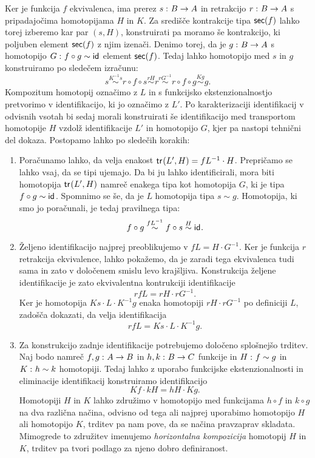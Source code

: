 \begin{dokaz}
  Ker je funkcija \(f\) ekvivalenca, ima prerez \(s \,\colon B \to A\) in retrakcijo \(r \,\colon B \to A\) s pripadajočima homotopijama \(H\) in \(K\). Za središče kontrakcije tipa \(\textnormal{\textsf{sec}}(f)\) lahko torej izberemo kar par \((s, H)\), konstruirati pa moramo še kontrakcijo, ki poljuben element \(\textnormal{\textsf{sec}}(f)\) z njim izenači.
  Denimo torej, da je \(g \,\colon B \to A\) s homotopijo \(G \,\colon f \circ g \sim \textnormal{\textsf{id}}_{}\) element \(\textnormal{\textsf{sec}}(f)\). Tedaj lahko homotopijo med \(s\) in \(g\) konstruiramo po sledečem izračunu:
  \[s \overset{K^{-1}s}{\sim} r \circ f \circ s \overset{rH}{\sim}
    r \overset{rG^{-1}}{\sim} r \circ f \circ g \overset{Kg}{\sim} g.\]
  Kompozitum homotopij označimo z \(L\) in s funkcijsko ekstenzionalnostjo pretvorimo v identifikacijo, ki jo označimo z \(L'\). Po karakterizaciji identifikacij v odvisnih vsotah bi sedaj morali konstruirati še identifikacijo med transportom homotopije \(H\) vzdolž identifikacije \(L'\) in homotopijo \(G\), kjer pa nastopi tehnični del dokaza. Postopamo lahko po sledečih korakih:
  \begin{enumerate}
  \item Poračunamo lahko, da velja enakost \(\textnormal{\textsf{tr}}_{}(L', H) = fL^{-1} \cdot H\). Prepričamo se lahko vsaj, da se tipi ujemajo. Da bi ju lahko identificirali, mora biti homotopija \(\textnormal{\textsf{tr}}_{}(L', H)\) namreč enakega tipa kot homotopija \(G\), ki je tipa \(f \circ g \sim \textnormal{\textsf{id}}_{}\). Spomnimo se še, da je \(L\) homotopija tipa \(s \sim g\). Homotopija, ki smo jo poračunali, je tedaj pravilnega tipa:
    \[f \circ g \overset{fL^{-1}}{\sim} f \circ s \overset{H}{\sim} \textnormal{\textsf{id}}_{}.\]

  \item Željeno identifikacijo najprej preoblikujemo v \(fL = H \cdot G^{-1}\). Ker je funkcija \(r\) retrakcija ekvivalence, lahko pokažemo, da je zaradi tega ekvivalenca tudi sama in zato v določenem smislu levo krajšljiva. Konstrukcija željene identifikacije je zato ekvivalentna kontrukciji identifikacije \[rfL = rH \cdot rG^{-1}.\]
    Ker je homotopija \(Ks \cdot L \cdot K^{-1}g\) enaka homotopiji \(rH \cdot rG^{-1}\) po definiciji \(L\), zadošča dokazati, da velja identifikacija
    \[rfL = Ks \cdot L \cdot K^{-1}g.\]

  \item Za konstrukcijo zadnje identifikacije potrebujemo določeno splošnejšo trditev. Naj bodo namreč \(f, g \,\colon A \to B\) in \(h, k \,\colon B \to C\) funkcije in
    \(H \,\colon f \sim g\) in \(K \,\colon h \sim k\) homotopiji. Tedaj lahko z uporabo funkcijske ekstenzionalnosti in eliminacije identifikacij konstruiramo identifikacijo
    \[Kf \cdot kH = hH \cdot Kg.\]
    Homotopiji \(H\) in \(K\) lahko združimo v homotopijo med funkcijama \(h \circ f\) in \(k \circ g\) na dva različna načina, odvisno od tega ali najprej uporabimo homotopijo \(H\) ali homotopijo \(K\), trditev pa nam pove, da se načina pravzaprav skladata. Mimogrede to združitev imenujemo \emph{horizontalna kompozicija} homotopij \(H\) in \(K\), trditev pa tvori podlago za njeno dobro definiranost.


\end{enumerate}
\end{dokaz}
